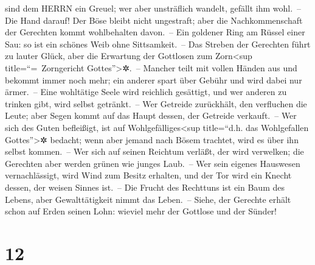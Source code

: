 sind dem HERRN ein Greuel; wer aber unsträflich wandelt, gefällt ihm
wohl.~-- Die Hand darauf! Der Böse bleibt nicht
ungestraft; aber die Nachkommenschaft der Gerechten kommt wohlbehalten
davon.~-- Ein goldener Ring am Rüssel einer Sau: so ist
ein schönes Weib ohne Sittsamkeit.~-- Das Streben der
Gerechten führt zu lauter Glück, aber die Erwartung der Gottlosen zum
Zorn\textless sup title=``=~Zorngericht Gottes''\textgreater✲.~--
Mancher teilt mit vollen Händen aus und bekommt immer
noch mehr; ein anderer spart über Gebühr und wird dabei nur ärmer.~--
Eine wohltätige Seele wird reichlich gesättigt, und wer
anderen zu trinken gibt, wird selbst getränkt.~-- Wer
Getreide zurückhält, den verfluchen die Leute; aber Segen kommt auf das
Haupt dessen, der Getreide verkauft.~-- Wer sich des
Guten befleißigt, ist auf Wohlgefälliges\textless sup title=``d.h. das
Wohlgefallen Gottes''\textgreater✲ bedacht; wenn aber jemand nach Bösem
trachtet, wird es über ihn selbst kommen.~-- Wer sich auf
seinen Reichtum verläßt, der wird verwelken; die Gerechten aber werden
grünen wie junges Laub.~-- Wer sein eigenes Hauswesen
vernachlässigt, wird Wind zum Besitz erhalten, und der Tor wird ein
Knecht dessen, der weisen Sinnes ist.~-- Die Frucht des
Rechttuns ist ein Baum des Lebens, aber Gewalttätigkeit nimmt das
Leben.~-- Siehe, der Gerechte erhält schon auf Erden
seinen Lohn: wieviel mehr der Gottlose und der Sünder!

\hypertarget{section-11}{%
\section{12}\label{section-11}}

